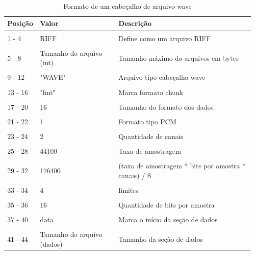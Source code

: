 \begin{table}[H]
\centering
\caption{Formato de um cabeçalho de arquivo wave}
\label{tab:app}
\smallskip
\begin{tabular}{|l|l|l|}
\hline
Posição & Valor & Descrição\\[0.5ex]
\hline
&&\\[-2ex]
1 - 4& RIFF & Define como um arquivo RIFF \\[0.5ex]
\hline
&&\\[-2ex]
5 - 8& Tamanho do arquivo (int) & Tamanho máximo do arquivos em bytes \\[0.5ex]
\hline
&&\\[-2ex]
9 - 12 & "WAVE" & Arquivo tipo cabeçalho wave\\[0.5ex]
\hline
&&\\[-2ex]
13 - 16& "fmt" & Marca formato chunk \\[0.5ex]
\hline
&&\\[-2ex]
17 - 20& 16& Tamanho do formato dos dados \\[0.5ex]
\hline
&&\\[-2ex]
21 - 22& 1& Formato tipo PCM\\[0.5ex]
\hline
&&\\[-2ex]
23 - 24& 2 & Quantidade de canais\\[0.5ex]
\hline
&&\\[-2ex]
25 - 28& 44100 & Taxa de amostragem \\[0.5ex]
\hline
&&\\[-2ex]
29 - 32& 176400& (taxa de amostragem * bits por amostra * canais) / 8 \\[0.5ex]
\hline
&&\\[-2ex]
33 - 34&  4 & limites \\[0.5ex]
\hline
&&\\[-2ex]
35 - 36& 16 & Quantidade de bits por amostra \\[0.5ex]
\hline
&&\\[-2ex]
37 - 40& data & Marca o início da seção de dados \\[0.5ex]
\hline
&&\\[-2ex]
41 - 44& Tamanho do arquivo (dados) & Tamanho da seção de dados \\[0.5ex]
\hline
\end{tabular}
\end{table}



